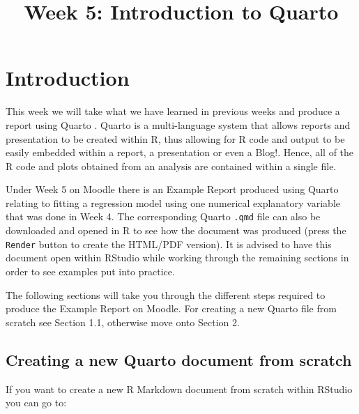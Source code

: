 \documentclass[
  letterpaper,
  DIV=11,
  numbers=noendperiod]{scrartcl}
\title{Week 5: Introduction to Quarto}
\author{}
\date{}
\renewcommand*\contentsname{Table of contents}
\newcommand\contentsname{Table of contents}
\begin{document}
\maketitle
\ifdefined\Shaded\renewenvironment{Shaded}{\begin{tcolorbox}[sharp corners, interior hidden, boxrule=0pt, breakable, borderline west={3pt}{0pt}{shadecolor}, frame hidden, enhanced]}{\end{tcolorbox}}\fi

\renewcommand*\contentsname{Contents}
{
\hypersetup{linkcolor=}
\setcounter{tocdepth}{3}
\tableofcontents
}
\hypertarget{introduction}{%
\section{Introduction}\label{introduction}}

This week we will take what we have learned in previous weeks and
produce a report using Quarto . Quarto is a multi-language system that
allows reports and presentation to be created within R, thus allowing
for R code and output to be easily embedded within a report, a
presentation or even a Blog!. Hence, all of the R code and plots
obtained from an analysis are contained within a single file.

Under Week 5 on Moodle there is an Example Report produced using Quarto
relating to fitting a regression model using one numerical explanatory
variable that was done in Week 4. The corresponding Quarto \texttt{.qmd}
file can also be downloaded and opened in R to see how the document was
produced (press the \texttt{Render} button to create the HTML/PDF
version). It is advised to have this document open within RStudio while
working through the remaining sections in order to see examples put into
practice.

The following sections will take you through the different steps
required to produce the Example Report on Moodle. For creating a new
Quarto file from scratch see Section 1.1, otherwise move onto Section 2.

\hypertarget{creating-a-new-quarto-document-from-scratch}{%
\subsection{Creating a new Quarto document from
scratch}\label{creating-a-new-quarto-document-from-scratch}}

If you want to create a new R Markdown document from scratch within
RStudio you can go to:
\end{document}

